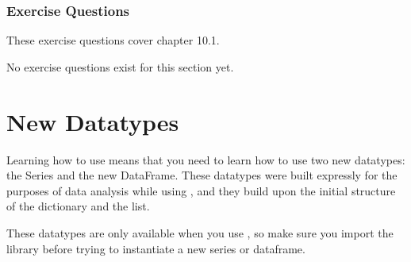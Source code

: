\subsubsection*{Exercise Questions}
These exercise questions cover chapter 10.1.

No exercise questions exist for this section yet.
\section{New Datatypes}
Learning how to use  means that you need to learn how to use two new datatypes: the Series and the new DataFrame. These datatypes were built expressly for the purposes of data analysis while using , and they build upon the initial structure of the dictionary and the list.\par
These datatypes are only available when you use , so make sure you import the  library before trying to instantiate a new series or dataframe.
